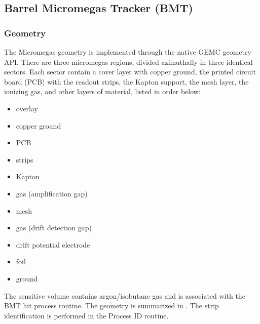\subsection{Barrel Micromegas Tracker (BMT)}

\subsubsection{Geometry}

The Micromegas geometry is implemented through the native GEMC geometry API.
There are three micromegas regions, divided azimuthally in three identical sectors. Each sector contain a cover layer with copper ground,
the printed circuit board (PCB) with the readout strips, the Kapton support, the mesh layer, the ionizing gas, and other layers of material, listed in order below:

\begin{itemize}
	\item overlay
	\item copper ground
	\item PCB
	\item strips
	\item Kapton
	\item gas (amplification gap)
	\item mesh
	\item gas (drift detection gap)
	\item drift potential electrode
	\item foil
	\item ground
\end{itemize}

The sensitive volume contains argon/isobutane gas and is associated with the BMT hit process routine.
The geometry is summarized in . The strip identification is performed in the Process ID routine.

